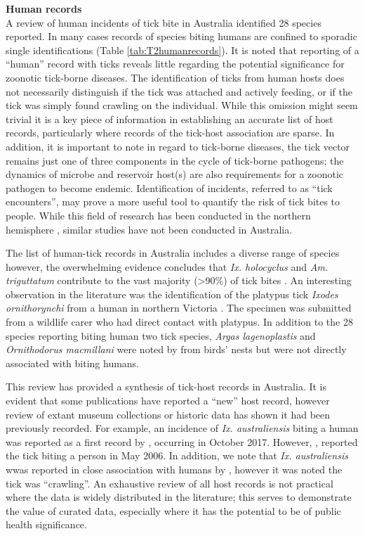 \documentclass[a4paper, nobind]{templates/ociamthesis}
\begin{document}
\textbf{Human records}\\
A review of human incidents of tick bite in Australia identified 28 species reported.
In many cases records of species biting humans are confined to sporadic single identifications (Table \ref{tab:T2humanrecords}).
It is noted that reporting of a ``human'' record with ticks reveals little regarding the potential significance for zoonotic tick-borne diseases.
The identification of ticks from human hosts does not necessarily distinguish if the tick was attached and actively feeding, or if the tick was simply found crawling on the individual.
While this omission might seem trivial it is a key piece of information in establishing an accurate list of host records, particularly where records of the tick-host association are sparse.
In addition, it is important to note in regard to tick-borne diseases, the tick vector remains just one of three components in the cycle of tick-borne pathogens; the dynamics of microbe and reservoir host(s) are also requirements for a zoonotic pathogen to become endemic.
Identification of incidents, referred to as ``tick encounters'', may prove a more useful tool to quantify the risk of tick bites to people.
While this field of research has been conducted in the northern hemisphere \autocite{hookHumanTickEncounters2021}, similar studies have not been conducted in Australia.

The list of human-tick records in Australia includes a diverse range of species however, the overwhelming evidence concludes that \emph{Ix. holocyclus} and \emph{Am. triguttatum} contribute to the vast majority (\textgreater90\%) of tick bites \autocite{goftonBacterialProfilingReveals2015,geary30YearsSamples2020}.
An interesting observation in the literature was the identification of the platypus tick \emph{Ixodes ornithorynchi} from a human in northern Victoria \autocite{geary30YearsSamples2020}. The specimen was submitted from a wildlife carer who had direct contact with platypus. In addition to the 28 species reporting biting human two tick species, \emph{Argas lagenoplastis} and \emph{Ornithodorus macmillani} were noted by \textcite{geary30YearsSamples2020} from birds' nests but were not directly associated with biting humans.

This review has provided a synthesis of tick-host records in Australia.
It is evident that some publications have reported a ``new'' host record, however review of extant museum collections or historic data has shown it had been previously recorded.
For example, an incidence of \emph{Ix. australiensis} biting a human was reported as a first record by \textcite{kwakFirstRecordsHuman2018}, occurring in October 2017.
However, \textcite{rabyNewFociSpotted2016}, reported the tick biting a person in May 2006.
In addition, we note that \emph{Ix. australiensis} wwas reported in close association with humans by \textcite{robertsAustralianTicks1970}, however it was noted the tick was ``crawling''. An exhaustive review of all host records is not practical where the data is widely distributed in the literature; this serves to demonstrate the value of curated data, especially where it has the potential to be of public health significance.
\end{document}
